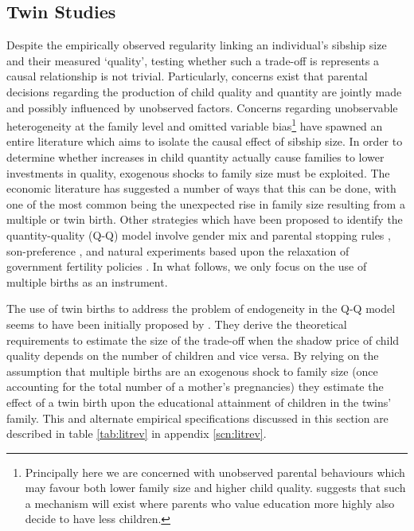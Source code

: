 \documentclass{article}[11pt,subeqn]
\begin{document}
\begin{spacing}{1.5}
\section{Twin Studies}
\label{scn:lit}
\vspace{-5mm}
Despite the empirically observed regularity linking an individual's sibship size and their measured `quality', testing whether such a trade-off is represents a
causal relationship is not trivial.  Particularly, concerns exist that parental decisions regarding the production of child quality and quantity are jointly made and 
possibly influenced by unobserved factors.  Concerns regarding unobservable heterogeneity at the family level and omitted variable bias\footnote{Principally 
here we are concerned with unobserved parental 
behaviours which may favour both lower family size and higher child quality.  \citet{Qian2009} suggests that such a mechanism will exist where parents who 
value education more highly also decide to have less children.} have spawned an entire literature which aims to isolate the causal effect of sibship size.  In 
order to determine whether increases in child quantity actually cause families to lower investments in quality, exogenous shocks to family size must be exploited.  
The economic literature has suggested a number of ways that this can be done, with one of the most common being the unexpected rise in family size resulting 
from a multiple or twin birth.  Other strategies which have been 
proposed to identify the quantity-quality (Q-Q) model involve gender mix and parental stopping rules \citep{ConleyGlauber2006}, son-preference \citep{Lee2008}, 
and natural experiments based upon the relaxation of government fertility policies \citep{Qian2009}.   In what follows, we only focus on the use of multiple 
births as an instrument.


The use of twin births to address the problem of endogeneity in the Q-Q model seems to have been initially proposed by \citet{RosenzweigWolpin1980}.  
They derive the theoretical requirements to estimate the size of the trade-off when the shadow price of child quality depends on the number 
of children and vice versa.  By relying on the assumption that multiple births are an exogenous shock to family size (once accounting for 
the total number of a mother's pregnancies) they estimate the effect of a twin birth upon the educational attainment of children in the twins' 
family.  This and alternate empirical specifications discussed in this section are described in table \ref{tab:litrev} in appendix \ref{scn:litrev}.  


\end{spacing}
\end{document}
